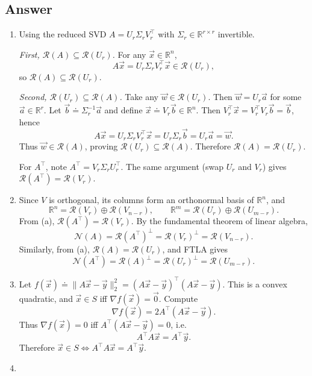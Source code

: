 \documentclass[
  12pt,
]{fphw}
\begin{document}
\subsection*{Answer}
\begin{enumerate}
\item[(a)] Using the reduced SVD $A=U_r\Sigma_r V_r^\top$ with $\Sigma_r\in\mathbb{R}^{r\times r}$ invertible.

\emph{First, $\mathcal{R}(A)\subseteq \mathcal{R}(U_r)$.}
For any $\vec x\in\mathbb{R}^n$,
\[
A\vec x = U_r\Sigma_r V_r^\top \vec x \in \mathcal{R}(U_r),
\]
so $\mathcal{R}(A)\subseteq \mathcal{R}(U_r)$.

\emph{Second, $\mathcal{R}(U_r)\subseteq \mathcal{R}(A)$.}
Take any $\vec w\in\mathcal{R}(U_r)$. Then $\vec w=U_r\vec a$ for some $\vec a\in\mathbb{R}^r$.
Let $\vec b \doteq \Sigma_r^{-1}\vec a$ and define $\vec x \doteq V_r \vec b\in\mathbb{R}^n$.
Then $V_r^\top \vec x = V_r^\top V_r \vec b = \vec b$, hence
\[
A\vec x = U_r\Sigma_r V_r^\top \vec x = U_r\Sigma_r \vec b = U_r\vec a = \vec w.
\]
Thus $\vec w\in\mathcal{R}(A)$, proving $\mathcal{R}(U_r)\subseteq \mathcal{R}(A)$.
Therefore $\mathcal{R}(A)=\mathcal{R}(U_r)$.

For $A^\top$, note $A^\top = V_r\Sigma_r U_r^\top$. The same argument (swap $U_r$ and $V_r$) gives
$\mathcal{R}(A^\top)=\mathcal{R}(V_r)$.

\item[(b)] Since $V$ is orthogonal, its columns form an orthonormal basis of $\mathbb{R}^n$, and
\[
\mathbb{R}^n=\mathcal{R}(V_r)\oplus \mathcal{R}(V_{n-r}),\qquad
\mathbb{R}^m=\mathcal{R}(U_r)\oplus \mathcal{R}(U_{m-r}).
\]
From (a), $\mathcal{R}(A^\top)=\mathcal{R}(V_r)$. By the fundamental theorem of linear algebra,
\[
\mathcal{N}(A)=\mathcal{R}(A^\top)^\perp = \mathcal{R}(V_r)^\perp = \mathcal{R}(V_{n-r}).
\]
Similarly, from (a), $\mathcal{R}(A)=\mathcal{R}(U_r)$, and FTLA gives
\[
\mathcal{N}(A^\top)=\mathcal{R}(A)^\perp = \mathcal{R}(U_r)^\perp = \mathcal{R}(U_{m-r}).
\]

\item[(c)] Let $f(\vec x)\doteq \|A\vec x-\vec y\|_2^2=(A\vec x-\vec y)^\top(A\vec x-\vec y)$.
This is a convex quadratic, and $\vec x\in S$ iff $\nabla f(\vec x)=\vec 0$.
Compute
\[
\nabla f(\vec x)=2A^\top(A\vec x-\vec y).
\]
Thus $\nabla f(\vec x)=0$ iff $A^\top(A\vec x-\vec y)=0$, i.e.
\[
A^\top A\vec x = A^\top \vec y.
\]
Therefore $\vec x\in S \iff A^\top A\vec x=A^\top \vec y$.

\item[(d)]


\end{enumerate}
\end{document}
